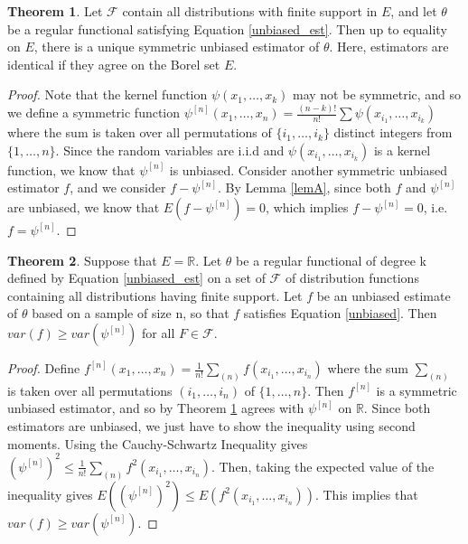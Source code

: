 \documentclass{article}
\newcommand{\R}{{\mathbb{R}}}
\theoremstyle{definition}
\newtheorem{theorem}{Theorem}
\numberwithin{Def}{section}
\begin{document}
\begin{theorem}\label{unique}
Let $\mathcal{F}$ contain all distributions with finite support in $E$, and let $\theta$ be a regular functional satisfying Equation \ref{unbiased_est}. Then up to equality on $E$, there is a unique symmetric unbiased estimator of $\theta$. Here, estimators are identical if they agree on the Borel set $E$.
\end{theorem}
\begin{proof}
Note that the kernel function $\psi(x_1, \dotsc, x_k)$ may not be symmetric, and so we define a symmetric function $\psi^{[n]}(x_1, \dotsc, x_n) = \frac{(n-k)!}{n!}\sum \psi(x_{i_1}, \dotsc, x_{i_k})$ where the sum is taken over all permutations of $\{i_1, \dotsc, i_k\}$ distinct integers from $\{1, \dotsc, n\}$. Since the random variables are i.i.d and $\psi(x_{i_1}, \dotsc, x_{i_k})$ is a kernel function, we know that $\psi^{[n]}$ is unbiased. Consider another symmetric unbiased estimator $f$, and we consider $f - \psi^{[n]}$. By Lemma \ref{lemA}, since both $f$ and $\psi^{[n]}$ are unbiased, we know that $E(f - \psi^{[n]}) = 0$, which implies $f - \psi^{[n]} = 0$, i.e. $f = \psi^{[n]}$. 
\end{proof}

 \begin{theorem}
    Suppose that $E = \R$. Let $\theta$ be a regular functional of degree k defined by Equation \ref{unbiased_est} on a set of $\mathcal{F}$ of distribution functions containing all distributions having finite support. Let $f$ be an unbiased estimate of $\theta$ based on a sample of size n, so that $f$ satisfies Equation \ref{unbiased}. Then $var(f) \geq var(\psi^{[n]})$ for all $F \in \mathcal{F}$. 
    \end{theorem}
    
   \begin{proof}
    Define $f^{[n]}(x_1, \dotsc, x_n) = \frac{1}{n!}\sum_{(n)}f(x_{i_1}, \dotsc, x_{i_n})$ where the sum $\sum_{(n)}$ is taken over all permutations $(i_1, \dotsc, i_n)$ of $\{1, \dotsc, n\}$. Then $f^{[n]}$ is a symmetric unbiased estimator, and so by Theorem \ref{unique} agrees with $\psi^{[n]}$ on $\R$. Since both estimators are unbiased, we just have to show the inequality using second moments. Using the Cauchy-Schwartz Inequality gives $(\psi^{[n]})^2 \leq \frac{1}{n!}\sum_{(n)}f^2(x_{i_1}, \dotsc, x_{i_n})$. Then, taking the expected value of the inequality gives $E((\psi^{[n]})^2) \leq E(f^2(x_{i_1}, \dotsc, x_{i_n}))$. This implies that $var(f) \geq var(\psi^{[n]})$.
    \end{proof}
 
\end{document}
